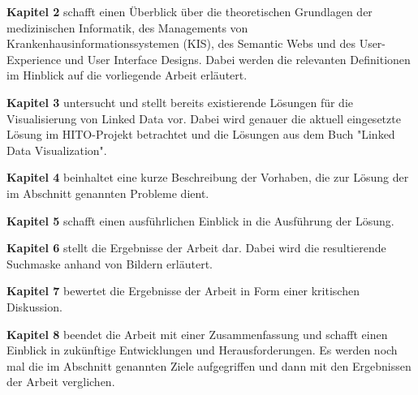 \textbf{Kapitel 2} schafft einen Überblick über die theoretischen Grundlagen der medizinischen Informatik, des Managements von Krankenhausinformationssystemen (KIS), des Semantic Webs und des User-Experience und User Interface Designs. Dabei werden die relevanten Definitionen im Hinblick auf die vorliegende Arbeit erläutert.  \newline

\textbf{Kapitel 3} untersucht und stellt bereits existierende Lösungen für die Visualisierung von Linked Data vor. Dabei wird genauer die aktuell eingesetzte Lösung im HITO-Projekt betrachtet und die Lösungen aus dem Buch "Linked Data Visualization". \newline

\textbf{Kapitel 4} beinhaltet eine kurze Beschreibung der Vorhaben, die zur Lösung der im Abschnitt  genannten Probleme dient. \newline

\textbf{Kapitel 5} schafft einen ausführlichen Einblick in die Ausführung der Lösung.  \newline

\textbf{Kapitel 6} stellt die Ergebnisse der Arbeit dar. Dabei wird die resultierende Suchmaske anhand von Bildern erläutert. \newline

\textbf{Kapitel 7} bewertet die Ergebnisse der Arbeit in Form einer kritischen Diskussion. \newline

\textbf{Kapitel 8} beendet die Arbeit mit einer Zusammenfassung und schafft einen Einblick in zukünftige Entwicklungen und Herausforderungen. Es werden noch mal die im Abschnitt  genannten Ziele aufgegriffen und dann mit den Ergebnissen der Arbeit verglichen.



